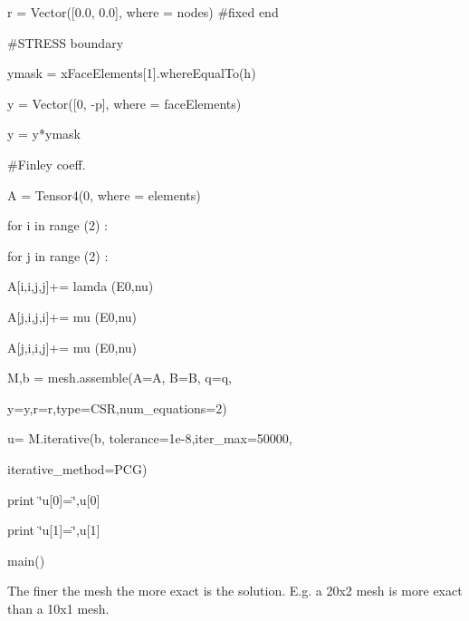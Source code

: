 \begin{python}
     r = Vector({[}0.0, 0.0{]}, where = nodes) \#fixed end



     \#STRESS boundary

     ymask = xFaceElements{[}1{]}.whereEqualTo(h)

     y = Vector({[}0, -p{]}, where = faceElements)

     y = y{*}ymask



     \#Finley coeff.

     A = Tensor4(0, where = elements)

     for i in range (2) :

        for j in range (2) :

           A{[}i,i,j,j{]}+= lamda (E0,nu)

           A{[}j,i,j,i{]}+= mu (E0,nu)

           A{[}j,i,i,j{]}+= mu (E0,nu)



     M,b = mesh.assemble(A=A, B=B, q=q,         

     y=y,r=r,type=CSR,num\_equations=2)

     u= M.iterative(b, tolerance=1e-8,iter\_max=50000,

     iterative\_method=PCG)

     print \char`\"{}u{[}0{]}=\char`\"{},u{[}0{]}

     print \char`\"{}u{[}1{]}=\char`\"{},u{[}1{]}

main()
\end{python}
The finer the mesh the more exact is the solution. E.g. a 20x2 mesh
is more exact than a 10x1 mesh. 

